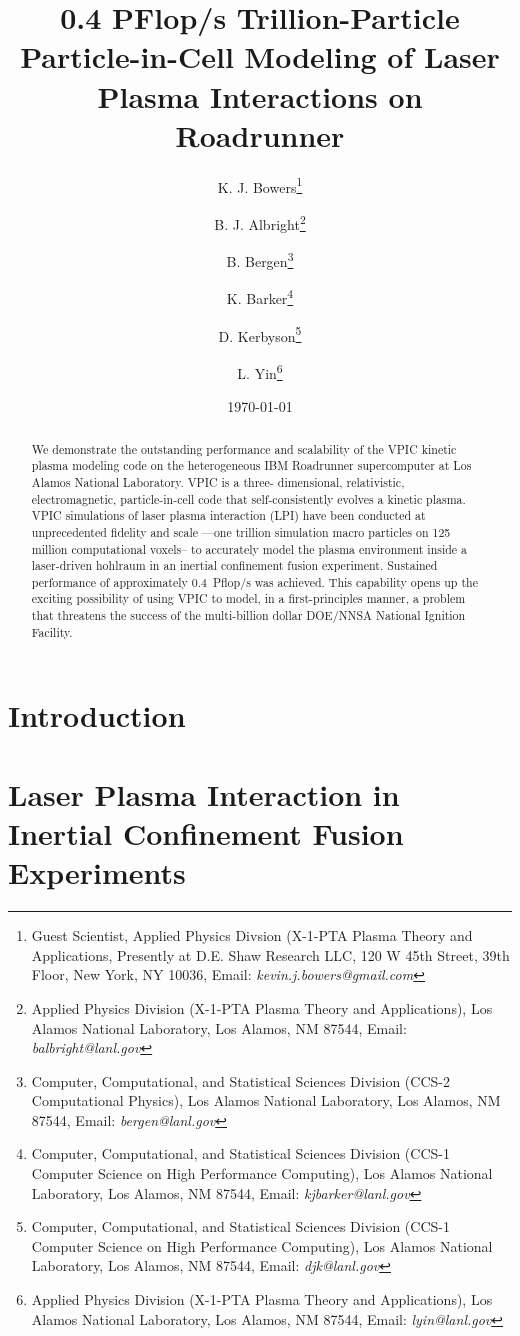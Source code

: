 \documentclass[10pt]{article}
\title{0.4 PFlop/s Trillion-Particle Particle-in-Cell Modeling of Laser Plasma Interactions on Roadrunner}
\author{%
K. J. Bowers\thanks{Guest Scientist, Applied Physics Divsion (X-1-PTA Plasma Theory and Applications, Presently at D.E. Shaw Research LLC, 120 W 45th Street, 39th Floor, New York, NY 10036, Email: \emph{kevin.j.bowers@gmail.com}} \and%
%
B. J. Albright\thanks{Applied Physics Division (X-1-PTA Plasma Theory and Applications), Los Alamos National Laboratory, Los Alamos, NM 87544, Email: \emph{balbright@lanl.gov}} \and%
%
B. Bergen\thanks{Computer, Computational, and Statistical Sciences Division (CCS-2 Computational Physics), Los Alamos National Laboratory, Los Alamos, NM 87544, Email: \emph{bergen@lanl.gov}} \and%
%
K. Barker\thanks{Computer, Computational, and Statistical Sciences Division (CCS-1 Computer Science on High Performance Computing), Los Alamos National Laboratory, Los Alamos, NM 87544, Email: \emph{kjbarker@lanl.gov}} \and%
%
D. Kerbyson\thanks{Computer, Computational, and Statistical Sciences Division (CCS-1 Computer Science on High Performance Computing), Los Alamos National Laboratory, Los Alamos, NM 87544, Email: \emph{djk@lanl.gov}} \and%
%
L. Yin\thanks{Applied Physics Division (X-1-PTA Plasma Theory and Applications), Los Alamos National Laboratory, Los Alamos, NM 87544, Email: \emph{lyin@lanl.gov}}}
\date{\today}
\begin{document}
\maketitle
\thispagestyle{empty}

\begin{singlespace}
\begin{abstract}
We demonstrate the outstanding performance and scalability of the VPIC 
kinetic plasma modeling code on the heterogeneous IBM Roadrunner 
supercomputer at Los Alamos National Laboratory.  VPIC is a three-
dimensional, relativistic, electromagnetic, particle-in-cell code that 
self-consistently evolves a kinetic plasma.  VPIC simulations of laser 
plasma interaction (LPI) have been conducted at unprecedented fidelity 
and scale ---one trillion simulation macro particles on 125 million 
computational voxels-- to accurately model the plasma environment 
inside a laser-driven hohlraum in an inertial confinement fusion 
experiment.   Sustained performance of approximately 0.4~Pflop/s was 
achieved.  This capability opens up the exciting possibility of using 
VPIC to model, in a first-principles manner, a problem that threatens 
the success of the multi-billion dollar DOE/NNSA National Ignition Facility.  
\end{abstract}
\end{singlespace}

\pagebreak

\section*{Introduction}

\section*{Laser Plasma Interaction in Inertial Confinement Fusion Experiments}
\end{document}
